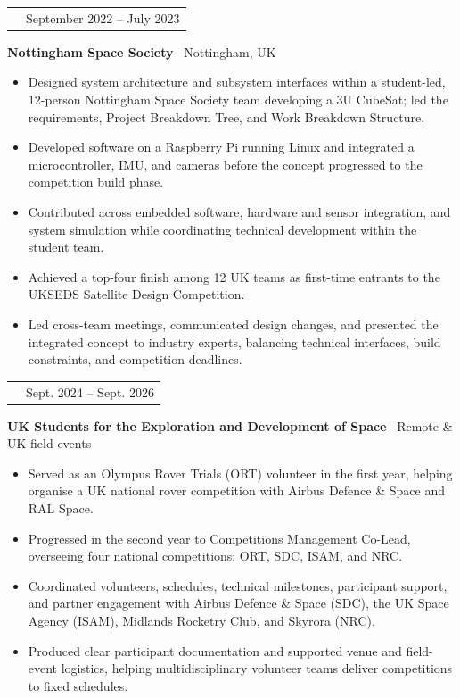 \documentclass[10pt,a4paper]{article}
\makeatletter
\newcommand{\RoleSize}{10.3pt}
\newcommand{\CompanySize}{9.6pt}
\newcommand{\DurationSize}{9pt}
\newcommand{\BodySize}{9.2pt}
\newcommand{\RoleLineSize}{11.5pt}
\newcommand{\CompanyLineSize}{10.8pt}
\newcommand{\DurationLineSize}{9pt}
\newcommand{\BodyLineSize}{11pt}
\newcommand{\EntryBefore}{0pt}
\newcommand{\RoleToCompany}{-5pt}
\newcommand{\CompanyToBullets}{3pt}
\newcommand{\EntryAfter}{6pt}
\newcommand{\BulletSpacing}{2pt}
\newcommand{\BulletBefore}{0pt}
\newcommand{\BulletIndent}{1.25em}
\newcommand{\DurationWidth}{4.5cm}
\newcommand{\CVEntry}[5]{

    \vspace{\EntryBefore}


    \noindent
    \begin{tabularx}{\textwidth}{
        @{}
        >{\raggedright\arraybackslash}X
        >{\raggedleft\arraybackslash}p{\DurationWidth}
        @{}
    }

        {\fontsize{\RoleSize}{\RoleLineSize}
        \selectfont
        \textbf{\textcolor{CVBlack}{#1}}}
        &
        {\fontsize{\DurationSize}{\DurationLineSize}
        \selectfont
        \textcolor{CVGray}{#4}}

    \end{tabularx}

    \vspace{\RoleToCompany}


    \noindent
    {\fontsize{\CompanySize}{\CompanyLineSize}
    \selectfont
    \textbf{\textcolor{CVDarkGray}{#2}}
    \textcolor{CVGray}{\textbar\ #3}}

    \vspace{\CompanyToBullets}


    \begin{itemize}[
        leftmargin=\BulletIndent,
        itemsep=\BulletSpacing,
        topsep=\BulletBefore,
        parsep=0pt,
        partopsep=0pt
    ]
        #5
    \end{itemize}

    \vspace{\EntryAfter}
}
\newcommand{\CVBullet}[1]{
    \item
    {\fontsize{\BodySize}{\BodyLineSize}
    \selectfont
    \textcolor{CVDarkGray}{#1}}
}
\makeatother
\begin{document}
\clearpage

\CVEntry
{IDET-Sat -- Systems Engineer}
{Nottingham Space Society}
{Nottingham, UK}
{September 2022 -- July 2023}
{
    \CVBullet{Designed system architecture and subsystem interfaces within a student-led, 12-person Nottingham Space Society team developing a 3U CubeSat; led the requirements, Project Breakdown Tree, and Work Breakdown Structure.}

    \CVBullet{Developed software on a Raspberry Pi running Linux and integrated a microcontroller, IMU, and cameras before the concept progressed to the competition build phase.}

    \CVBullet{Contributed across embedded software, hardware and sensor integration, and system simulation while coordinating technical development within the student team.}

    \CVBullet{Achieved a top-four finish among 12 UK teams as first-time entrants to the UKSEDS Satellite Design Competition.}

    \CVBullet{Led cross-team meetings, communicated design changes, and presented the integrated concept to industry experts, balancing technical interfaces, build constraints, and competition deadlines.}
}

\CVEntry
{UKSEDS Volunteer}
{UK Students for the Exploration and Development of Space}
{Remote \& UK field events}
{Sept. 2024 -- Sept. 2026}
{
    \CVBullet{Served as an Olympus Rover Trials (ORT) volunteer in the first year, helping organise a UK national rover competition with Airbus Defence \& Space and RAL Space.}

    \CVBullet{Progressed in the second year to Competitions Management Co-Lead, overseeing four national competitions: ORT, SDC, ISAM, and NRC.}

    \CVBullet{Coordinated volunteers, schedules, technical milestones, participant support, and partner engagement with Airbus Defence \& Space (SDC), the UK Space Agency (ISAM), Midlands Rocketry Club, and Skyrora (NRC).}

    \CVBullet{Produced clear participant documentation and supported venue and field-event logistics, helping multidisciplinary volunteer teams deliver competitions to fixed schedules.}
}

\end{document}

